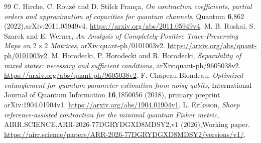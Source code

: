 \documentclass[11pt]{article}
\theoremstyle{remark}
\begin{document}
\begin{thebibliography}{99}
C. Hirche, C. Rouz\'e and D. Stilck Fran\c{c}a,
\emph{On contraction coefficients, partial orders and approximation of capacities for quantum channels},
Quantum \textbf{6},862 (2022),arXiv:2011.05949v4.
\url{https://arxiv.org/abs/2011.05949v4}.
M. B. Ruskai, S. Szarek and E. Werner,
\emph{An Analysis of Completely-Positive Trace-Preserving Maps on $2\times2$ Matrices},
arXiv:quant-ph/0101003v2. \url{https://arxiv.org/abs/quant-ph/0101003v2}.
M. Horodecki, P. Horodecki and R. Horodecki,
\emph{Separability of mixed states: necessary and sufficient conditions},
arXiv:quant-ph/9605038v2. \url{https://arxiv.org/abs/quant-ph/9605038v2}.
F. Chapeau-Blondeau,
\emph{Optimized entanglement for quantum parameter estimation from noisy qubits},
International Journal of Quantum Information \textbf{16},1850056 (2018),
primary preprint arXiv:1904.01904v1.
\url{https://arxiv.org/abs/1904.01904v1}.
L. Eriksson,
\emph{Sharp reference-assisted contraction for the minimal quantum Fisher metric},
AIRR.SCIENCE,ARR-2026-77DGRYDGXD8MDSY2,v1 (2026),Working paper.
\url{https://airr.science/papers/ARR-2026-77DGRYDGXD8MDSY2/versions/v1/}.
\end{thebibliography}
\end{document}
